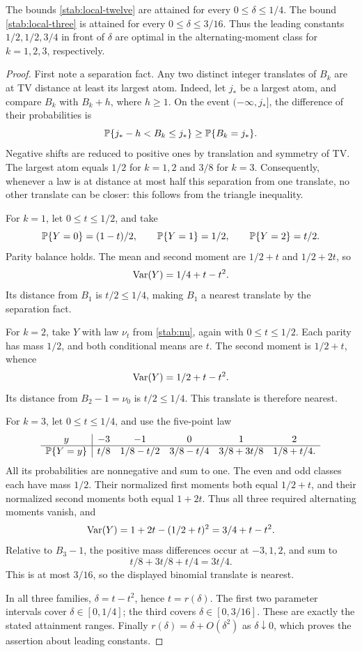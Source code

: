 \begin{proposition}
\label{stab:sharpness}
The bounds \eqref{stab:local-twelve} are attained for every
\(0\le\delta\le1/4\).  The bound \eqref{stab:local-three} is
attained for every \(0\le\delta\le3/16\).  Thus the leading constants
\(1/2,1/2,3/4\) in front of \(\delta\) are optimal in the
alternating-moment class for \(k=1,2,3\), respectively.
\end{proposition}

\begin{proof}
First note a separation fact.  Any two distinct integer translates
of \(B_k\) are at TV distance at least its largest atom.  Indeed,
let \(j_*\) be a largest atom, and compare \(B_k\) with \(B_k+h\),
where \(h\ge1\).  On the event \((-\infty,j_*]\), the difference
of their probabilities is
\[
\mathbb P\{j_*-h<B_k\le j_*\}\ge\mathbb P\{B_k=j_*\}.
\]
Negative shifts are reduced to positive ones by translation and
symmetry of TV.  The largest atom equals \(1/2\) for \(k=1,2\)
and \(3/8\) for \(k=3\).  Consequently, whenever a law is at
distance at most half this separation from one translate, no other
translate can be closer: this follows from the triangle inequality.

For \(k=1\), let \(0\le t\le1/2\), and take
\[
\mathbb P\{Y=0\}=(1-t)/2,\qquad
\mathbb P\{Y=1\}=1/2,\qquad
\mathbb P\{Y=2\}=t/2.
\]
Parity balance holds.  The mean and second moment are
\(1/2+t\) and \(1/2+2t\), so
\[
\operatorname{Var}(Y)=1/4+t-t^2.
\]
Its distance from \(B_1\) is \(t/2\le1/4\), making \(B_1\)
a nearest translate by the separation fact.

For \(k=2\), take \(Y\) with law \(\nu_t\) from
\eqref{stab:nu}, again with \(0\le t\le1/2\).
Each parity has mass \(1/2\), and both conditional means are \(t\).
The second moment is \(1/2+t\), whence
\[
\operatorname{Var}(Y)=1/2+t-t^2.
\]
Its distance from \(B_2-1=\nu_0\) is \(t/2\le1/4\).
This translate is therefore nearest.

For \(k=3\), let \(0\le t\le1/4\), and use the five-point law
\begin{equation}
\label{stab:sharp-three-family}
\begin{array}{c|ccccc}
y&-3&-1&0&1&2\\ \hline
\mathbb P\{Y=y\}
&t/8&1/8-t/2&3/8-t/4&3/8+3t/8&1/8+t/4 .
\end{array}
\end{equation}
All its probabilities are nonnegative and sum to one.  The even
and odd classes each have mass \(1/2\).  Their normalized first
moments both equal \(1/2+t\), and their normalized second moments
both equal \(1+2t\).  Thus all three required alternating moments
vanish, and
\[
\operatorname{Var}(Y)=1+2t-(1/2+t)^2=3/4+t-t^2.
\]
Relative to \(B_3-1\), the positive mass differences occur at
\(-3,1,2\), and sum to
\[
t/8+3t/8+t/4=3t/4.
\]
This is at most \(3/16\), so the displayed binomial translate is
nearest.

In all three families, \(\delta=t-t^2\), hence
\(t=r(\delta)\).  The first two parameter intervals cover
\(\delta\in[0,1/4]\); the third covers \(\delta\in[0,3/16]\).
These are exactly the stated attainment ranges.
Finally \(r(\delta)=\delta+O(\delta^2)\) as
\(\delta\downarrow0\), which proves the assertion about leading
constants.
\end{proof}

